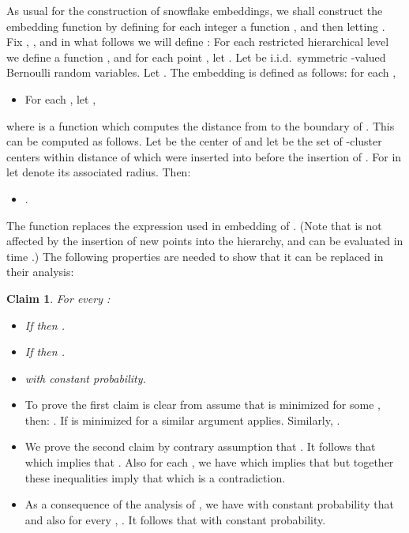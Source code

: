 \documentclass[11pt]{article}
\newtheorem{claim}[theorem]{Claim}
\newenvironment{proof}{{\bf Proof:\ }}{\hfill\medskip}
\begin{document}
As usual for the construction of snowflake embeddings, we shall construct the
embedding function  by defining for each integer  a function
, and then letting
.
Fix , , and in what follows we will define :
For each restricted hierarchical level  we define a
function , and for each point
, let .
Let  be i.i.d.\ symmetric
-valued Bernoulli random variables.
Let .
The embedding is defined as follows: for each ,
\begin{itemize}
\item For each , let ,
\end{itemize}
where  is a function which computes the distance from 
to the boundary of . This can be computed as follows. Let
 be the center of  and let  be the set of
-cluster centers within distance  of  which were
inserted into  before the insertion of . For  in 
let  denote its associated radius. Then:
\begin{itemize}
\item .
\end{itemize}
The function  replaces the
expression  used in embedding of
\cite{AbBaNe08}. (Note that  is not affected by the insertion of new points
into the hierarchy, and can be evaluated in time .) The following
properties are needed to show that it can be replaced in their analysis:

\begin{claim}
\label{claim:distance-to-boundary}
For every :

\begin{itemize}
\item If  then .
\item If  then .
\item  with constant probability.
\end{itemize}
\end{claim}
\begin{proof}
\begin{itemize}
\item To prove the first claim is clear from assume that  is
minimized for some , then: . If  is
minimized for  a similar argument applies. Similarly, .

\item We prove the second claim by contrary assumption that . It follows that  which
implies that . Also for each
, we have  which implies
that  but together these
inequalities imply that  which is a contradiction.

\item As a consequence of the analysis of \cite{AbBaNe08},
we have with constant probability that  and also
for every , . It follows that
 with constant probability.
\end{itemize}
\end{proof}
\end{document}

